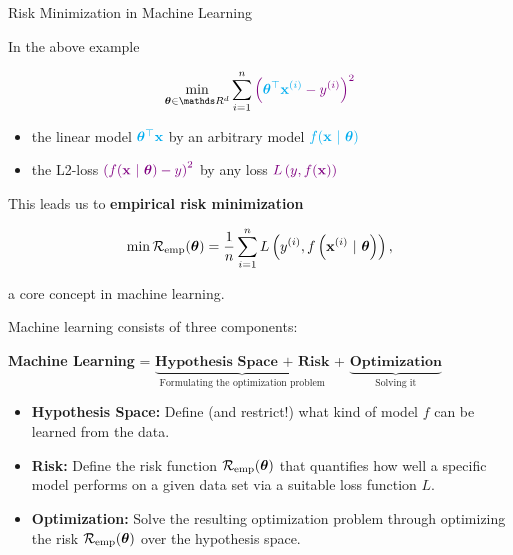 \begin{vbframe}{Risk Minimization in Machine Learning}
	
In the above example

$$
\min_{\thetab \in \R^d} \sum_{i = 1}^n \textcolor{violet}{\left(\textcolor{cyan}{\thetab^\top \xi} - \yi\right)^2}
$$

\begin{itemize}
	\item the linear model $\textcolor{cyan}{\bm{\theta}^\top \mathbf{x}}$ by an arbitrary model $\textcolor{cyan}{f(\mathbf{x} ~|~ \bm{\theta})}$ %
	\item the L2-loss $\textcolor{violet}{\left(f(\mathbf{x} ~|~ \bm{\theta}) - y\right)^2}$ by any loss $\textcolor{violet}{L\left(y, f(\mathbf{x})\right)}$
\end{itemize}

\lz 

This leads us to \textbf{empirical risk minimization}

	$$
	\min \mathcal{R}_{\text{emp}}(\bm{\theta}) = \frac{1}{n} \sum\limits_{i=1}^n L\left(y^{(i)}, f\left(\mathbf{x}^{(i)} ~|~ \bm{\theta}\right)\right),
	$$

a core concept in machine learning. 

\framebreak 

Machine learning consists of three components: 

\begin{center}

  \textbf{Machine Learning} = $\underbrace{\textbf{Hypothesis Space + Risk}}_{\text{Formulating the optimization problem}}$ + $\underbrace{\textbf{Optimization}}_{\text{Solving it}}$
  
\end{center}

\lz

\begin{itemize}

  \item \textbf{Hypothesis Space:} Define (and restrict!) what kind of model 
  $f$ can be learned from the data.
  
  \item \textbf{Risk:} Define the risk function $\mathcal{R}_{\text{emp}}(\bm{\theta})$ that quantifies how well a specific model performs on a given 
  data set via a suitable loss function $L$.
  
  \item \textbf{Optimization:} Solve the resulting optimization problem through optimizing the risk $\mathcal{R}_{\text{emp}}(\bm{\theta})$ over the hypothesis space.
  
\end{itemize}

\end{vbframe}

